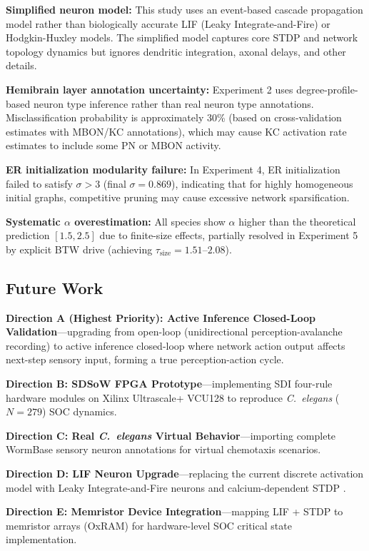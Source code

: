 \documentclass[12pt,a4paper]{article}
\begin{document}
\textbf{Simplified neuron model:} This study uses an event-based cascade propagation model rather than biologically accurate LIF (Leaky Integrate-and-Fire) or Hodgkin-Huxley models. The simplified model captures core STDP and network topology dynamics but ignores dendritic integration, axonal delays, and other details.

\textbf{Hemibrain layer annotation uncertainty:} Experiment 2 uses degree-profile-based neuron type inference rather than real neuron type annotations. Misclassification probability is approximately 30\% (based on cross-validation estimates with MBON/KC annotations), which may cause KC activation rate estimates to include some PN or MBON activity.

\textbf{ER initialization modularity failure:} In Experiment 4, ER initialization failed to satisfy $\sigma > 3$ (final $\sigma=0.869$), indicating that for highly homogeneous initial graphs, competitive pruning may cause excessive network sparsification.

\textbf{Systematic $\alpha$ overestimation:} All species show $\alpha$ higher than the theoretical prediction $[1.5, 2.5]$ due to finite-size effects, partially resolved in Experiment 5 by explicit BTW drive (achieving $\tau_{\text{size}}=1.51$--$2.08$).

\subsection{Future Work}

\textbf{Direction A (Highest Priority): Active Inference Closed-Loop Validation}---upgrading from open-loop (unidirectional perception-avalanche recording) to active inference closed-loop where network action output affects next-step sensory input, forming a true perception-action cycle.

\textbf{Direction B: SDSoW FPGA Prototype}---implementing SDI four-rule hardware modules on Xilinx Ultrascale+ VCU128 to reproduce \textit{C.\ elegans} ($N=279$) SOC dynamics.

\textbf{Direction C: Real \textit{C.\ elegans} Virtual Behavior}---importing complete WormBase sensory neuron annotations for virtual chemotaxis scenarios.

\textbf{Direction D: LIF Neuron Upgrade}---replacing the current discrete activation model with Leaky Integrate-and-Fire neurons and calcium-dependent STDP \citep{bcm1982}.

\textbf{Direction E: Memristor Device Integration}---mapping LIF + STDP to memristor arrays (OxRAM) for hardware-level SOC critical state implementation.
\end{document}
